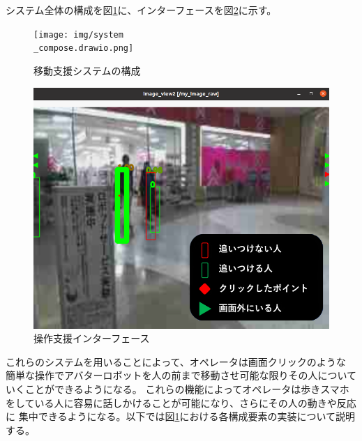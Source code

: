 \documentclass{kuisthesis}
\begin{document}
システム全体の構成を図\ref{pic:systemcompose}に、インターフェースを図\ref{pic:interface}に示す。
\begin{figure}[htb]
  \centering
  \texttt{[image: img/system\\\_compose.drawio.png]}
  \caption{移動支援システムの構成}
  \label{pic:systemcompose}
\end{figure}
\begin{figure}[htb]
  \centering
  \includegraphics[width=13cm]{img/interface.png}
  \caption{操作支援インターフェース}
  \label{pic:interface}
\end{figure}
これらのシステムを用いることによって、オペレータは画面クリックのような
簡単な操作でアバターロボットを人の前まで移動させ可能な限りその人についていくことができるようになる。
これらの機能によってオペレータは歩きスマホをしている人に容易に話しかけることが可能になり、さらにその人の動きや反応に
集中できるようになる。以下では図\ref{pic:systemcompose}における各構成要素の実装について説明する。
\end{document}
